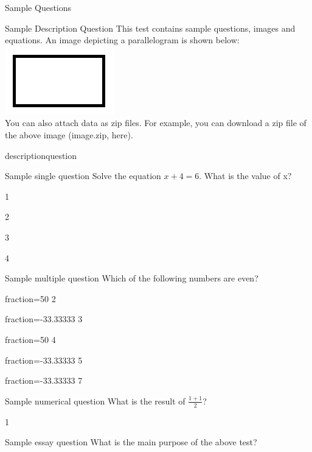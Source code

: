 \documentclass[12pt]{article}
\begin{document}
\begin{quiz}{Sample Questions}

\begin{shortanswer}[default grade=0.0000000, penalty=0.0000000]{Sample Description Question}
This test contains sample questions, images and equations. An image depicting a parallelogram is shown below:\\
\includegraphics{image.png}\\
You can also attach data as zip files. For example, you can download a zip file of the above image ({{image.zip, here}}).
\color{white}
\item descriptionquestion
\end{shortanswer}

\begin{multi}{Sample single question}
Solve the equation ${x + 4 = 6}$. What is the value of x?
\item 1
\item* 2
\item 3
\item 4
\end{multi}

\begin{multi}[multiple]{Sample multiple question}
Which of the following numbers are even?
\item[fraction=50] 2
\item[fraction=-33.33333] 3
\item[fraction=50] 4
\item[fraction=-33.33333] 5
\item[fraction=-33.33333] 7
\end{multi}

\begin{numerical}{Sample numerical question}
What is the result of ${\frac{1 + 1}{2}}$?
\item 1
\end{numerical}

\begin{essay}{Sample essay question}
What is the main purpose of the above test?
\end{essay}

\end{quiz}
\end{document}
